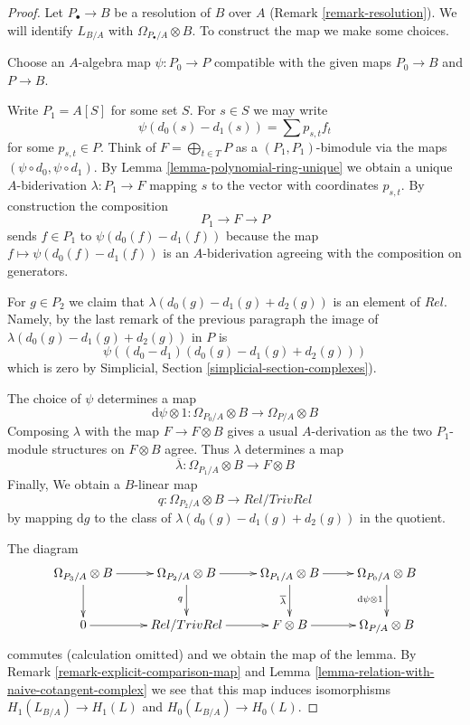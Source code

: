 \begin{proof}
Let $P_\bullet \to B$ be a resolution of $B$ over $A$
(Remark \ref{remark-resolution}). We will identify $L_{B/A}$ with
$\Omega_{P_\bullet/A} \otimes B$. To construct the map we
make some choices.

\medskip\noindent
Choose an $A$-algebra map $\psi : P_0 \to P$ compatible with the
given maps $P_0 \to B$ and $P \to B$.

\medskip\noindent
Write $P_1 = A[S]$ for some set $S$. For $s \in S$ we may write
$$
\psi(d_0(s) - d_1(s)) = \sum p_{s, t} f_t
$$
for some $p_{s, t} \in P$. Think of $F = \bigoplus_{t \in T} P$
as a $(P_1, P_1)$-bimodule via the maps $(\psi \circ d_0, \psi \circ d_1)$.
By Lemma \ref{lemma-polynomial-ring-unique} we obtain a unique
$A$-biderivation $\lambda : P_1 \to F$ mapping $s$ to the vector with
coordinates $p_{s, t}$. By construction the composition
$$
P_1 \longrightarrow F \longrightarrow P
$$
sends $f \in P_1$ to $\psi(d_0(f) - d_1(f))$ because the map
$f \mapsto \psi(d_0(f) - d_1(f))$ is an $A$-biderivation agreeing with
the composition on generators.

\medskip\noindent
For $g \in P_2$ we claim that $\lambda(d_0(g) - d_1(g) + d_2(g))$
is an element of $Rel$. Namely, by the last remark of the previous
paragraph the image of $\lambda(d_0(g) - d_1(g) + d_2(g))$ in $P$ is
$$
\psi((d_0 - d_1)(d_0(g) - d_1(g) + d_2(g)))
$$
which is zero by Simplicial, Section \ref{simplicial-section-complexes}).

\medskip\noindent
The choice of $\psi$ determines a map
$$
\text{d}\psi \otimes 1 :
\Omega_{P_0/A} \otimes B
\longrightarrow
\Omega_{P/A} \otimes B
$$
Composing $\lambda$ with the map $F \to F \otimes B$ gives a
usual $A$-derivation as the two $P_1$-module structures on
$F \otimes B$ agree. Thus $\lambda$ determines a map
$$
\overline{\lambda} :
\Omega_{P_1/A} \otimes B
\longrightarrow
F \otimes B
$$
Finally, We obtain a $B$-linear map
$$
q :
\Omega_{P_2/A} \otimes B
\longrightarrow
Rel/TrivRel
$$
by mapping $\text{d}g$ to the class of $\lambda(d_0(g) - d_1(g) + d_2(g))$
in the quotient.

\medskip\noindent
The diagram
$$
\xymatrix{
\Omega_{P_3/A} \otimes B \ar[r] \ar[d] &
\Omega_{P_2/A} \otimes B \ar[r] \ar[d]_q &
\Omega_{P_1/A} \otimes B \ar[r] \ar[d]_{\overline{\lambda}} &
\Omega_{P_0/A} \otimes B \ar[d]_{\text{d}\psi \otimes 1} \\
0 \ar[r] &
Rel/TrivRel \ar[r] &
F \otimes B \ar[r] &
\Omega_{P/A} \otimes B
}
$$
commutes (calculation omitted) and we obtain the map of the lemma.
By Remark \ref{remark-explicit-comparison-map} and
Lemma \ref{lemma-relation-with-naive-cotangent-complex} we see that this map
induces isomorphisms $H_1(L_{B/A}) \to H_1(L)$ and $H_0(L_{B/A}) \to H_0(L)$.


\end{proof}
